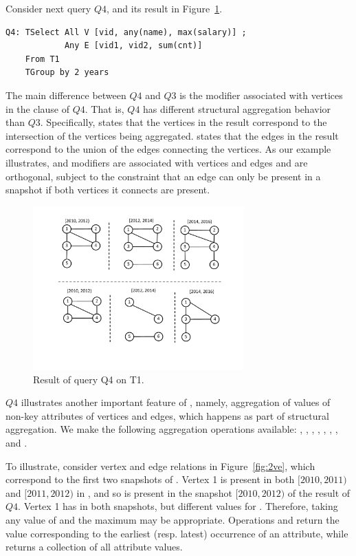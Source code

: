 Consider next query $Q4$, and its result in
Figure~\ref{fig:tg_all_any}.

\begin{small}
\begin{verbatim}
Q4: TSelect All V [vid, any(name), max(salary)] ; 
            Any E [vid1, vid2, sum(cnt)] 
    From T1 
    TGroup by 2 years
\end{verbatim}
\end{small}

The main difference between $Q4$ and $Q3$ is the  modifier
associated with vertices in the  clause of $Q4$.  That
is, $Q4$ has different structural aggregation behavior than $Q3$.
Specifically,  states that the vertices in the result
correspond to the intersection of the vertices being aggregated.
 states that the edges in the result correspond to the
union of the edges connecting the vertices.  As our example
illustrates,  and  modifiers are associated with
vertices and edges and are orthogonal, subject to the constraint that
an edge can only be present in a snapshot if both vertices it connects
are present.

\begin{figure}
\includegraphics[width=3.2in]{figs/TGroupAllAny.pdf}
\caption{Result of query Q4 on T1.}
\label{fig:tg_all_any}
\end{figure}

$Q4$ illustrates another important feature of \ql, namely, aggregation
of values of non-key attributes of vertices and edges, which happens
as part of structural aggregation.  We make the following aggregation
operations available: , , ,
, , , , and
.

To illustrate, consider vertex and edge relations in
Figure~\ref{fig:2ve}, which correspond to the first two snapshots of
.  Vertex 1 is present in both $[2010, 2011)$ and $[2011,
    2012)$ in , and so is present in the snapshot $[2010,
      2012)$ of the result of $Q4$.  Vertex 1 has 
      in both snapshots, but different values for .
      Therefore, taking any value of  and the maximum
       may be appropriate.  Operations  and
       return the value corresponding to the earliest
      (resp. latest) occurrence of an attribute, while 
      returns a collection of all attribute values.

